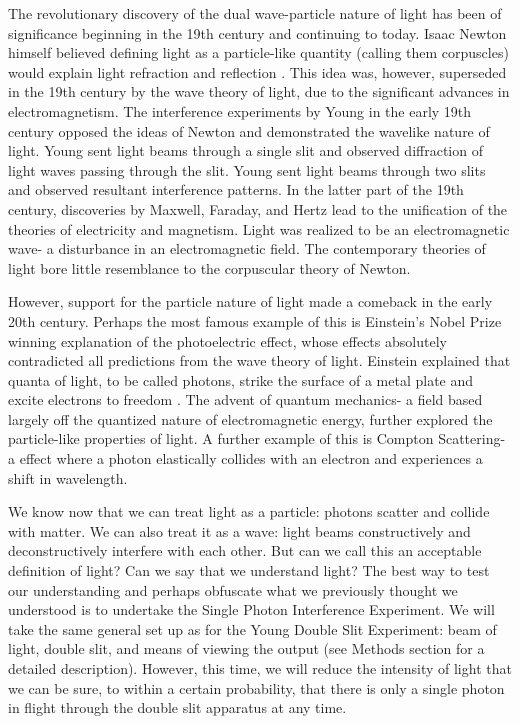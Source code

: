 \documentclass[prb,preprint]{revtex4-1}
\begin{document}
The revolutionary discovery of the dual wave-particle nature of light has been of significance beginning in the 19th century and continuing to today.  Isaac Newton himself believed defining light as a particle-like quantity (calling them corpuscles) would explain light refraction and reflection \cite{newton}.  This idea was, however, superseded in the 19th century by the wave theory of light, due to the significant advances in electromagnetism.  The interference experiments by Young in the early 19th century opposed the ideas of Newton and demonstrated the wavelike nature of light.  Young sent light beams through a single slit and observed diffraction of light waves passing through the slit.  Young sent light beams through two slits and observed resultant interference patterns.  In the latter part of the 19th century, discoveries by Maxwell, Faraday, and Hertz lead to the unification of the theories of electricity and magnetism.  Light was realized to be an electromagnetic wave- a disturbance in an electromagnetic field.  The contemporary theories of light bore little resemblance to the corpuscular theory of Newton.  \cite{david}

However, support for the particle nature of light made a comeback in the early 20th century.  Perhaps the most famous example of this is Einstein's Nobel Prize winning explanation of the photoelectric effect, whose effects absolutely contradicted all predictions from the wave theory of light.  Einstein explained that quanta of light, to be called photons, strike the surface of a metal plate and excite electrons to freedom \cite{modern}.  The advent of quantum mechanics- a field based largely off the quantized nature of electromagnetic energy, further explored the particle-like properties of light.  A further example of this is Compton Scattering- a effect where a photon elastically collides with an electron and experiences a shift in wavelength.  

We know now that we can treat light as a particle: photons scatter and collide with matter.  We can also treat it as a wave: light beams constructively and deconstructively interfere with each other.  But can we call this an acceptable definition of light?  Can we say that we understand light?  The best way to test our understanding and perhaps obfuscate what we previously thought we understood is to undertake the Single Photon Interference Experiment.  We will take the same general set up as for the Young Double Slit Experiment:  beam of light, double slit, and means of viewing the output (see Methods section for a detailed description).  However, this time, we will reduce the intensity of light that we can be sure, to within a certain probability, that there is only a single photon in flight through the double slit apparatus at any time. \cite{teachspin}
\end{document}
